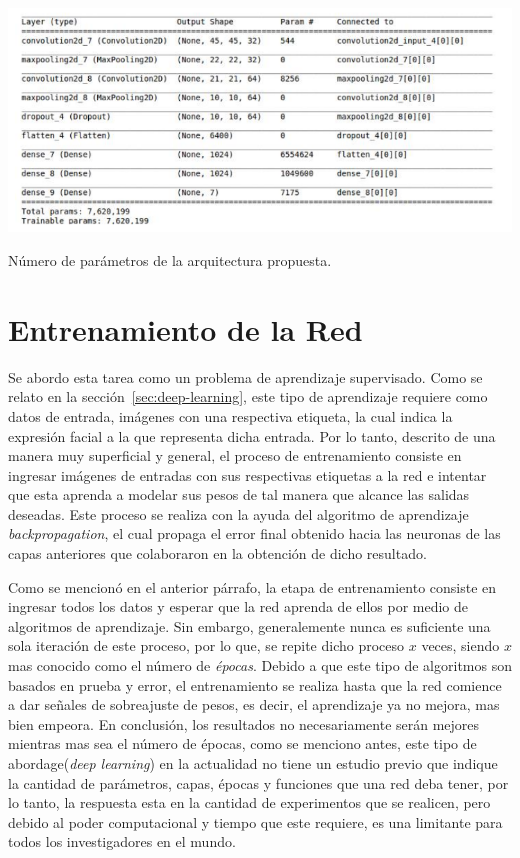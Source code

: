 \begin{table}[H]
    \centering
    \includegraphics[width=160mm]{Imagenes/parametros.png} 
    \caption{Número de parámetros de la arquitectura propuesta.}
    \label{tab:parametros}
\end{table}

	
\section{Entrenamiento de la Red}

Se abordo esta tarea como un problema de aprendizaje supervisado. Como se relato en la sección~\ref{sec:deep-learning}, este tipo de aprendizaje requiere como datos de entrada, imágenes con una respectiva etiqueta, la cual indica la expresión facial a la que representa dicha entrada. Por lo tanto, descrito de una manera muy superficial y general, el proceso de entrenamiento consiste en ingresar imágenes de entradas con sus respectivas etiquetas a la red e intentar que esta aprenda a modelar sus pesos de tal manera que alcance las salidas deseadas. Este proceso se realiza con la ayuda del algoritmo de aprendizaje \textit{backpropagation}, el cual propaga el error final obtenido hacia las neuronas de las capas anteriores que colaboraron en la obtención de dicho resultado.

Como se mencionó en el anterior párrafo, la etapa de entrenamiento consiste en ingresar todos los datos y esperar que la red aprenda de ellos por medio de algoritmos de aprendizaje. Sin embargo, generalemente nunca es suficiente una sola iteración de este proceso, por lo que, se repite dicho proceso $x$ veces, siendo $x$ mas conocido como el número de \textit{épocas}. Debido a que este tipo de algoritmos son basados en prueba y error, el entrenamiento se realiza hasta que la red comience a dar señales de sobreajuste de pesos, es decir, el aprendizaje ya no mejora, mas bien empeora. En conclusión, los resultados no necesariamente serán mejores mientras mas sea el número de épocas, como se menciono antes, este tipo de abordage(\textit{deep learning}) en la actualidad no tiene un estudio previo que indique la cantidad de parámetros, capas, épocas y funciones que una red deba tener, por lo tanto, la respuesta esta en la cantidad de experimentos que se realicen, pero debido al poder computacional y tiempo que este requiere, es una limitante para todos los investigadores en el mundo. 

